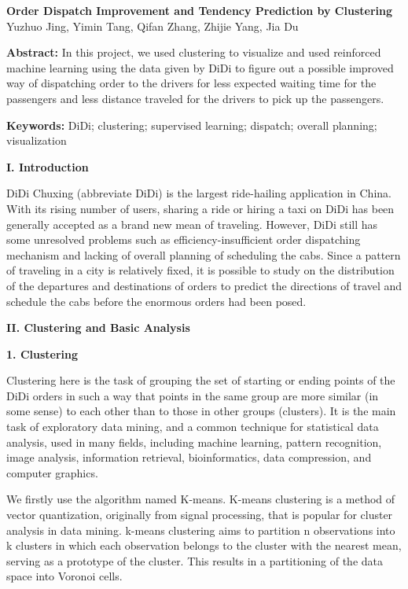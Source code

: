 \documentclass{article}
\newcommand{\AuthorName}{Yuzhuo Jing, Yimin Tang, Qifan Zhang, Zhijie Yang, Jia Du}
\begin{document}
\begin{center}
\Large\textbf{Order Dispatch Improvement and Tendency Prediction by Clustering}\\
\vspace{0.1in}
\normalsize{\AuthorName}
\end{center}

\quad \textbf{Abstract:} In this project, we used clustering to visualize and used reinforced machine learning using the data given by DiDi to figure out a possible improved way of dispatching order to the drivers for less expected waiting time for the passengers and less distance traveled for the drivers to pick up the passengers.

\quad \textbf{Keywords:} DiDi; clustering; supervised learning; dispatch; overall planning; visualization

\begin{center}
	\textbf{I. Introduction}
\end{center}

\qquad DiDi Chuxing (abbreviate DiDi) is the largest ride-hailing application in China. With its rising number of users, sharing a ride or hiring a taxi on DiDi has been generally accepted as a brand new mean of traveling. However, DiDi still has some unresolved problems such as efficiency-insufficient order dispatching mechanism and lacking of overall planning of scheduling the cabs. Since a pattern of traveling in a city is relatively fixed, it is possible to study on the distribution of the departures and destinations of orders to predict the directions of travel and schedule the cabs before the enormous orders had been posed.

\begin{center}
	\textbf{II. Clustering and Basic Analysis}
\end{center}

\textbf{1. Clustering}

\qquad Clustering here is the task of grouping the set of starting or ending points of the DiDi orders in such a way that points in the same group are more similar (in some sense) to each other than to those in other groups (clusters). It is the main task of exploratory data mining, and a common technique for statistical data analysis, used in many fields, including machine learning, pattern recognition, image analysis, information retrieval, bioinformatics, data compression, and computer graphics.\cite{clustering}

\qquad We firstly use the algorithm named K-means. K-means clustering is a method of vector quantization, originally from signal processing, that is popular for cluster analysis in data mining. k-means clustering aims to partition n observations into k clusters in which each observation belongs to the cluster with the nearest mean, serving as a prototype of the cluster. This results in a partitioning of the data space into Voronoi cells. \cite{kmeans}
\end{document}
